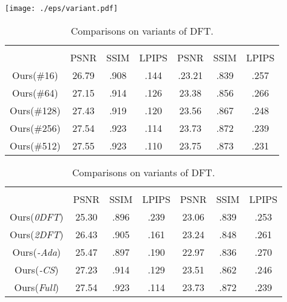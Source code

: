 \documentclass[runningheads]{llncs}
\begin{document}
\begin{figure*}[t]
	\setlength{\abovecaptionskip}{3pt}
	\setlength{\belowcaptionskip}{-16pt}
	\centering
	\texttt{[image: ./eps/variant.pdf]}
	\caption{Restoration results of our DFDNet variants.}
	\label{fig:variant}
\end{figure*}
\begin{table}[t]
\begin{minipage}{0.495\linewidth}
		\centering
		\caption{Comparisons on cluster number. }
		\label{tab:cluster}
		\scriptsize
		\setlength{\tabcolsep}{0.0mm}
		{
\begin{tabular}{|c| c c c | c c c |} 
				\hline
				\rowcolor{lightgray}& \multicolumn{3}{c|}{} & \multicolumn{3}{c|}{}\\
				\rowcolor{lightgray}\multirow{-2}{*}{\makecell[c]{Methods}}&
				\tiny PSNR &\tiny SSIM & \tiny LPIPS & \tiny PSNR & \tiny SSIM & \tiny LPIPS\\
				\hline \hline
				Ours(\#16) & 26.79 & .908 & .144 & .23.21 & .839 & .257 \\
				Ours(\#64) & 27.15 & .914 & .126  & 23.38 & .856 & .266 \\
				Ours(\#128) & 27.43 & .919 & .120  & 23.56 & .867 & .248 \\
				Ours(\#256) & 27.54 & .923 & .114  & 23.73 & .872 & .239 \\
				Ours(\#512) & 27.55 & .923 & .110  & 23.75 & .873 & .231 \\
				\hline
			\end{tabular} 
		}
	\end{minipage}
	\begin{minipage}{0.49\linewidth}  
		\centering
		\caption{Comparisons on variants of DFT. }
		\label{tab:var}
		\scriptsize
		\setlength{\tabcolsep}{0.0mm}
		{
\begin{tabular}{|c| c c c | c c c |} 
				\hline
				\rowcolor{lightgray}& \multicolumn{3}{c|}{} & \multicolumn{3}{c|}{}\\
				\rowcolor{lightgray}\multirow{-2}{*}{\makecell[c]{Methods}}&
				\tiny PSNR &\tiny SSIM & \tiny LPIPS & \tiny PSNR & \tiny SSIM & \tiny LPIPS\\
				\hline \hline
				Ours(\textit{0DFT}) & 25.30 & .896 & .239 & 23.06 & .839 & .253 \\
Ours(\textit{2DFT}) & 26.43 & .905 & .161 & 23.24 & .848 & .261 \\
				Ours(\textit{-Ada}) & 25.47 & .897 & .190 & 22.97 & .836 & .270 \\
				Ours(\textit{-CS})  & 27.23 & .914 & .129 & 23.51 & .862 & .246 \\
				Ours(\textit{Full}) & 27.54 & .923 & .114 & 23.73 & .872 & .239 \\
				\hline
			\end{tabular} 
		}
	\end{minipage}
\end{table}
\end{document}
